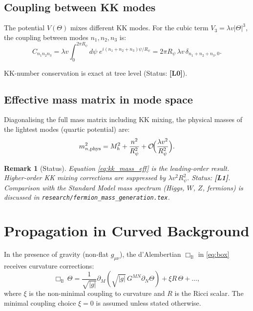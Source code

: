 \documentclass[11pt,a4paper]{article}
\newtheorem{remark}{Remark}
\begin{document}
\subsection{Coupling between KK modes}

The potential $V(\Theta)$ mixes different KK modes.  For the cubic term
$V_3 = \lambda v |\Theta|^3$, the coupling between modes $n_1, n_2, n_3$
is:
\begin{equation}
\label{eq:kk_coupling}
  C_{n_1 n_2 n_3}
  = \lambda v \int_0^{2\pi R_\psi} \!\! d\psi\;
    e^{i(n_1+n_2+n_3)\psi/R_\psi}
  = 2\pi R_\psi\, \lambda v\, \delta_{n_1+n_2+n_3,0}.
\end{equation}

KK-number conservation is exact at tree level (Status: \textbf{[L0]}).

\subsection{Effective mass matrix in mode space}

Diagonalising the full mass matrix including KK mixing, the physical masses
of the lightest modes (quartic potential) are:
\begin{equation}
\label{eq:kk_mass_eff}
  m_{n,\mathrm{phys}}^2
  = M_h^2 + \frac{n^2}{R_\psi^2}
    + \mathcal{O}\!\Bigl(\frac{\lambda v^2}{R_\psi^2}\Bigr).
\end{equation}

\begin{remark}[Status]
  Equation \eqref{eq:kk_mass_eff} is the leading-order result.
  Higher-order KK mixing corrections are suppressed by $\lambda v^2 R_\psi^2$.
  Status: \textbf{[L1]}.
  Comparison with the Standard Model mass spectrum (Higgs, $W$, $Z$, fermions)
  is discussed in \texttt{research/fermion\_mass\_generation.tex}.
\end{remark}

\section{Propagation in Curved Background}
\label{sec:curved}

In the presence of gravity (non-flat $g_{\mu\nu}$), the d'Alembertian
$\Box_{\mathbb{B}}$ in \eqref{eq:box} receives curvature corrections:
\begin{equation}
  \Box_{\mathbb{B}}\,\Theta
  = \frac{1}{\sqrt{|g|}}\partial_M(\sqrt{|g|}\,G^{MN}\partial_N\Theta)
    + \xi R\,\Theta + \ldots,
\end{equation}
where $\xi$ is the non-minimal coupling to curvature and $R$ is the Ricci
scalar.  The minimal coupling choice $\xi = 0$ is assumed unless stated
otherwise.
\end{document}
